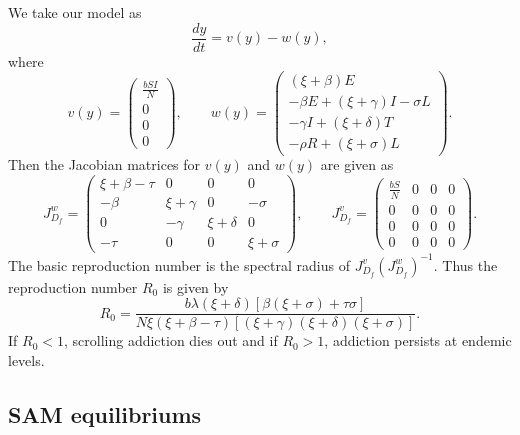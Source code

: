 \documentclass[10pt]{NSP1}
\begin{document}
	We take our model as
	\begin{equation}
		\frac{dy}{dt} = v(y) - w(y),
		\tag{3.9}
	\end{equation}
	where
	\begin{equation}
		v(y) = \begin{pmatrix} \frac{b S I}{N} \\ 0 \\ 0 \\ 0 \end{pmatrix}, \qquad
		w(y) = \begin{pmatrix} (\xi + \beta)E \\ -\beta E + (\xi + \gamma)I - \sigma L \\ -\gamma I + (\xi + \delta)T \\ -\rho R + (\xi + \sigma)L \end{pmatrix}.
		\tag{3.10}
	\end{equation}
	Then the Jacobian matrices for $v(y)$ and $w(y)$ are given as
	\begin{equation}
		J_{D_f}^{w} = \begin{pmatrix}
			\xi + \beta - \tau & 0 & 0 & 0 \\
			-\beta & \xi + \gamma & 0 & -\sigma \\
			0 & -\gamma & \xi + \delta & 0 \\
			-\tau & 0 & 0 & \xi + \sigma
		\end{pmatrix}, \qquad
		J_{D_f}^{v} = \begin{pmatrix}
			\frac{b S}{N} & 0 & 0 & 0 \\
			0 & 0 & 0 & 0 \\
			0 & 0 & 0 & 0 \\
			0 & 0 & 0 & 0
		\end{pmatrix}.
		\tag{3.11}
	\end{equation}
	The basic reproduction number is the spectral radius of $J_{D_f}^{v} (J_{D_f}^{w})^{-1}$. Thus the reproduction number $R_0$ is given by
	\begin{equation}
		R_0 = \frac{b \lambda (\xi + \delta) \left[ \beta (\xi + \sigma) + \tau \sigma \right]}{N \xi (\xi + \beta - \tau) \left[ (\xi + \gamma)(\xi + \delta)(\xi + \sigma) \right]}.
		\tag{3.12}
	\end{equation}
	If $R_0 < 1$, scrolling addiction dies out and if $R_0 > 1$, addiction persists at endemic levels.
	
	\subsection{\bfseries SAM equilibriums}
	
\end{document}
